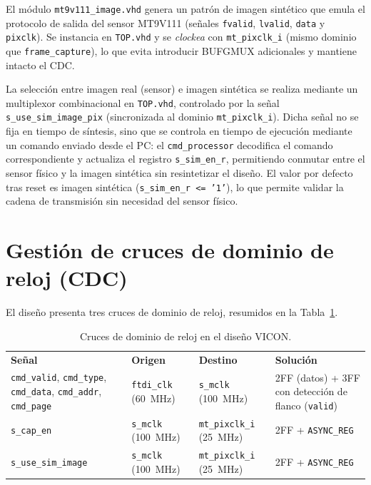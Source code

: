 \documentclass[../main.tex]{subfiles}
\begin{document}
El módulo \texttt{mt9v111\_image.vhd} genera un patrón de imagen sintético que emula el protocolo de salida del sensor MT9V111 (señales \texttt{fvalid}, \texttt{lvalid}, \texttt{data} y \texttt{pixclk}). Se instancia en \texttt{TOP.vhd} y se \textit{clockea} con \texttt{mt\_pixclk\_i} (mismo dominio que \texttt{frame\_capture}), lo que evita introducir BUFGMUX adicionales y mantiene intacto el \ac{CDC}.

La selección entre imagen real (sensor) e imagen sintética se realiza mediante un multiplexor combinacional en \texttt{TOP.vhd}, controlado por la señal \texttt{s\_use\_sim\_image\_pix} (sincronizada al dominio \texttt{mt\_pixclk\_i}). Dicha señal no se fija en tiempo de síntesis, sino que se controla en tiempo de ejecución mediante un comando enviado desde el PC: el \texttt{cmd\_processor} decodifica el comando correspondiente y actualiza el registro \texttt{s\_sim\_en\_r}, permitiendo conmutar entre el sensor físico y la imagen sintética sin resintetizar el diseño. El valor por defecto tras reset es imagen sintética (\texttt{s\_sim\_en\_r <= '1'}), lo que permite validar la cadena de transmisión sin necesidad del sensor físico.
\section{Gestión de cruces de dominio de reloj (CDC)}
\label{sec:cdc}

El diseño presenta tres cruces de dominio de reloj, resumidos en la Tabla~\ref{tab:cdc}.

\begin{table}[H]
\centering
\footnotesize
\caption{Cruces de dominio de reloj en el diseño VICON.}
\label{tab:cdc}
\renewcommand{\arraystretch}{1.3}
\begin{tabularx}{\textwidth}{>{\raggedright\arraybackslash}p{3.1cm}>{\raggedright\arraybackslash}X>{\raggedright\arraybackslash}X>{\raggedright\arraybackslash}p{2.7cm}}
\rowcolor[HTML]{156082}
{\color{white}\textbf{Señal}} & {\color{white}\textbf{Origen}} & {\color{white}\textbf{Destino}} & {\color{white}\textbf{Solución}} \\
\rowcolor[HTML]{C0E6F5}
\texttt{cmd\_valid}, \texttt{cmd\_type}, \texttt{cmd\_data}, \texttt{cmd\_addr}, \texttt{cmd\_page} & \texttt{ftdi\_clk} (60~MHz) & \texttt{s\_mclk} (100~MHz) & 2FF (datos) + 3FF con detección de flanco (\texttt{valid}) \\
\texttt{s\_cap\_en} & \texttt{s\_mclk} (100~MHz) & \texttt{mt\_pixclk\_i} (25~MHz) & 2FF + \texttt{ASYNC\_REG} \\
\rowcolor[HTML]{C0E6F5}
\texttt{s\_use\_sim\_image} & \texttt{s\_mclk} (100~MHz) & \texttt{mt\_pixclk\_i} (25~MHz) & 2FF + \texttt{ASYNC\_REG} \\
\end{tabularx}
\end{table}
\end{document}
